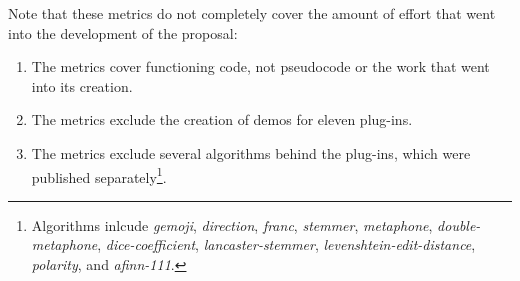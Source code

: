 Note that these metrics do not completely cover the amount of effort that
  went into the development of the proposal:

\begin{enumerate}
\item The metrics cover functioning code, not pseudocode or the work that
  went into its creation.
\item The metrics exclude the creation of demos for eleven plug-ins.
\item The metrics exclude several algorithms behind the plug-ins,
  which were published separately\footnote{Algorithms inlcude
    \emph{gemoji}, \emph{direction}, \emph{franc}, \emph{stemmer},
    \emph{metaphone}, \emph{double-metaphone}, \emph{dice-coefficient},
    \emph{lancaster-stemmer}, \emph{levenshtein-edit-distance},
    \emph{polarity}, and \emph{afinn-111}.
  }.
\end{enumerate}

\endgroup
